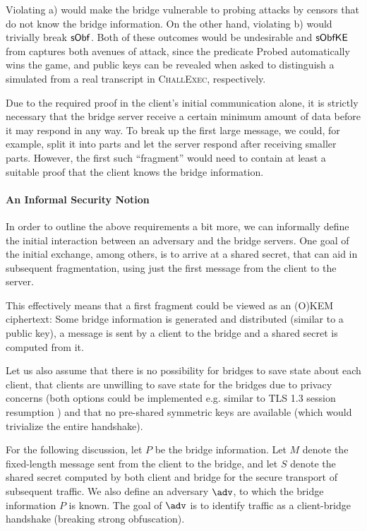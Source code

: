 Violating a) would make the bridge vulnerable to probing attacks by censors that do not know the bridge information. On the other hand, violating b) would trivially break $\mathsf{sObf}$. Both of these outcomes would be undesirable and $\mathsf{sObfKE}$ from \cite{CCS:GunSteVei24} captures both avenues of attack, since the predicate \textsf{Probed} automatically wins the game, and public keys can be revealed when asked to distinguish a simulated from a real transcript in \textsc{ChallExec}, respectively.

Due to the required proof in the client's initial communication alone, it is strictly necessary that the bridge server receive a certain minimum amount of data before it may respond in any way.
To break up the first large \drivel{} message, we could, for example, split it into parts and let the server respond after receiving smaller parts. However, the first such ``fragment'' would need to contain at least a suitable proof that the client knows the bridge information.

\paragraph{An Informal Security Notion}
In order to outline the above requirements a bit more, we can informally define the initial interaction between an adversary and the bridge servers. One goal of the initial exchange, among others, is to arrive at a shared secret, that can aid in subsequent fragmentation, using just the first message from the client to the server.

This effectively means that a first fragment could be viewed as an (O)KEM ciphertext: Some bridge information is generated and distributed (similar to a public key), a message is sent by a client to the bridge and a shared secret is computed from it.

Let us also assume that there is no possibility for bridges to save state about each client, that clients are unwilling to save state for the bridges due to privacy concerns (both options could be implemented e.g. similar to TLS 1.3 session resumption \cite[Section~2.2]{rfc8446}) and that no pre-shared symmetric keys are available (which would trivialize the entire handshake).

For the following discussion, let $P$ be the bridge information.
Let $M$ denote the fixed-length message sent from the client to the bridge, and let $S$ denote the shared secret computed by both client and bridge for the secure transport of subsequent traffic.
We also define an adversary $\adv$, to which the bridge information $P$ is known.
The goal of $\adv$ is to identify traffic as a client-bridge handshake (breaking strong obfuscation).

